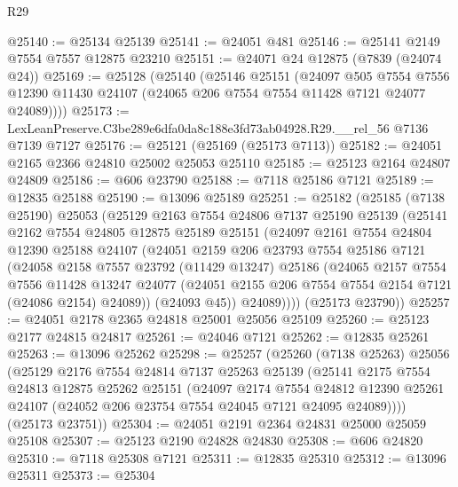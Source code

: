 \begin{lexlean}{R29}
\begin{coremodule}
@25140 := @25134 @25139
@25141 := @24051 @481
@25146 := @25141 @2149 @7554 @7557 @12875 @23210
@25151 := @24071 @24 @12875 (@7839 (@24074 @24))
@25169 := @25128
    (@25140
      (@25146
        @25151
        (@24097
          @505
          @7554
          @7556
          @12390
          @11430
          @24107
          (@24065 @206 @7554 @7554 @11428 @7121 @24077 @24089))))
@25173 := LexLeanPreserve.C3be289e6dfa0da8c188e3fd73ab04928.R29.__rel_56 @7136 @7139 @7127
@25176 := @25121 (@25169 (@25173 @7113))
@25182 := @24051 @2165 @2366 @24810 @25002 @25053 @25110
@25185 := @25123 @2164 @24807 @24809
@25186 := @606 @23790
@25188 := @7118 @25186 @7121
@25189 := @12835 @25188
@25190 := @13096 @25189
@25251 := @25182
    (@25185
      (@7138 @25190)
      @25053
      (@25129
        @2163
        @7554
        @24806
        @7137
        @25190
        @25139
        (@25141
          @2162
          @7554
          @24805
          @12875
          @25189
          @25151
          (@24097
            @2161
            @7554
            @24804
            @12390
            @25188
            @24107
            (@24051
              @2159
              @206
              @23793
              @7554
              @25186
              @7121
              (@24058
                @2158
                @7557
                @23792
                (@11429 @13247)
                @25186
                (@24065
                  @2157
                  @7554
                  @7556
                  @11428
                  @13247
                  @24077
                  (@24051 @2155 @206 @7554 @7554 @2154 @7121 (@24086 @2154) @24089))
                (@24093 @45))
              @24089))))
      (@25173 @23790))
@25257 := @24051 @2178 @2365 @24818 @25001 @25056 @25109
@25260 := @25123 @2177 @24815 @24817
@25261 := @24046 @7121
@25262 := @12835 @25261
@25263 := @13096 @25262
@25298 := @25257
    (@25260
      (@7138 @25263)
      @25056
      (@25129
        @2176
        @7554
        @24814
        @7137
        @25263
        @25139
        (@25141
          @2175
          @7554
          @24813
          @12875
          @25262
          @25151
          (@24097
            @2174
            @7554
            @24812
            @12390
            @25261
            @24107
            (@24052 @206 @23754 @7554 @24045 @7121 @24095 @24089))))
      (@25173 @23751))
@25304 := @24051 @2191 @2364 @24831 @25000 @25059 @25108
@25307 := @25123 @2190 @24828 @24830
@25308 := @606 @24820
@25310 := @7118 @25308 @7121
@25311 := @12835 @25310
@25312 := @13096 @25311
@25373 := @25304

\end{coremodule}
\end{lexlean}
